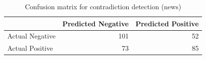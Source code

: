 \begin{table}
\caption{Confusion matrix for contradiction detection (news)}
\label{tab:confusion_matrix}
\begin{tabular}{lrr}
\toprule
 & Predicted Negative & Predicted Positive \\
\midrule
Actual Negative & 101 & 52 \\
Actual Positive & 73 & 85 \\
\bottomrule
\end{tabular}
\end{table}
